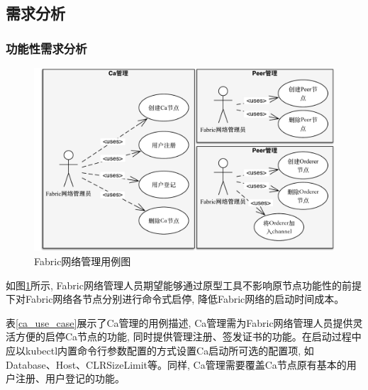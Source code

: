\subsection{需求分析}

\subsubsection{功能性需求分析}

\begin{figure}[!htbp] %
    \centering %
    \includegraphics[width=1.0\textwidth]{FIGs/chapter4/fabric_use_case.pdf} %
    \caption{Fabric网络管理用例图} %
    \label{fabric_use_case} %
\end{figure}%


如图\ref{fabric_use_case}所示, Fabric网络管理人员期望能够通过原型工具不影响原节点功能性的前提下对Fabric网络各节点分别进行命令式启停, 降低Fabric网络的启动时间成本。



表\ref{ca_use_case}展示了Ca管理的用例描述, Ca管理需为Fabric网络管理人员提供灵活方便的启停Ca节点的功能, 同时提供管理注册、签发证书的功能。在启动过程中应以kubectl内置命令行参数配置的方式设置Ca启动所可选的配置项, 如Database、Host、CLRSizeLimit等。同样, Ca管理需要覆盖Ca节点原有基本的用户注册、用户登记的功能。

